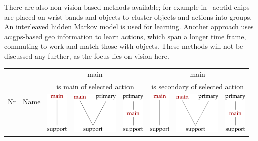 There are also non-vision-based methods available; for example in~\cite{modayil2008improving} \gls{ac:rfid} chips are placed on wrist bands and objects to cluster objects and actions into groups. 
An interleaved hidden Markov model is used for learning.
Another approach uses \gls{ac:gps}-based geo information to learn actions, which span a longer time frame, \eg commuting to work and match those with objects.
These methods will not be discussed any further, as the focus lies on vision here.


\begin{landscape}
\begin{longtable}[]{clccc|ccc}
  \toprule
  \multirow{3}{*}{Nr} & \multirow{3}{*}{Name} & \multicolumn{3}{c}{\textcolor{red1}{main}} & \multicolumn{3}{c}{\textcolor{red1}{main}}\\
  && \multicolumn{3}{c}{is main of selected action} & \multicolumn{3}{c}{is secondary of selected action}\\
  && \includegraphics[height=2cm]{./figures/sec/planning/ontologygraph1.png}&\includegraphics[height=2cm]{./figures/sec/planning/ontologygraph2.png}&\includegraphics[height=2cm]{./figures/sec/planning/ontologygraph3.png} &\includegraphics[height=2cm]{./figures/sec/planning/ontologygraph1.png}&\includegraphics[height=2cm]{./figures/sec/planning/ontologygraph2.png}&\includegraphics[height=2cm]{./figures/sec/planning/ontologygraph3.png}\\

\end{longtable}
\end{landscape}
